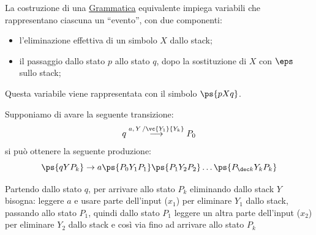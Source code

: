 \begin{remark}{}{}
    La costruzione di una \hyperref[def:cfg]{Grammatica} equivalente impiega variabili che rappresentano ciascuna un ``evento'', con due componenti:
    \begin{itemize}
        \item l'eliminazione effettiva di un simbolo $X$ dallo stack;
        \item il passaggio dallo stato $p$ allo stato $q$, dopo la sostituzione di $X$ con $\eps$ sullo stack;
    \end{itemize}
    Questa variabile viene rappresentata con il simbolo $\ps{pXq}$.
    \begin{example}{}{}
        Supponiamo di avare la seguente transizione:
        \[
            q \overset{a,\,Y\,/\vc{Y_1}{Y_k}}{\longrightarrow} P_0
        \]
        si può ottenere la seguente produzione:
        \[
            \ps{qYP_k}\to a \ps{P_0Y_1P_1}\ps{P_1Y_2P_2}\dots \ps{P_{\dec k}Y_kP_k}
        \]
        \begin{note}[Si legge:]
            Partendo dallo stato $q$, per arrivare allo stato $P_k$ eliminando dallo stack $Y$ bisogna: leggere $a$ e usare parte dell'input ($x_1$) per eliminare $Y_1$ dallo stack, passando allo stato $P_1$, quindi dallo stato $P_1$ leggere un altra parte dell'input ($x_2$) per eliminare $Y_2$ dallo stack e così via fino ad arrivare allo stato $P_k$
        \end{note}
    \end{example}
\end{remark}
